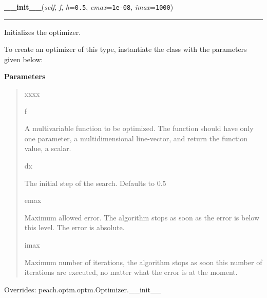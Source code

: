     \begin{boxedminipage}{\textwidth}

    \raggedright \textbf{\_\_init\_\_}(\textit{self}, \textit{f}, \textit{h}=\texttt{0.5}, \textit{emax}=\texttt{1e-08}, \textit{imax}=\texttt{1000})

    \vspace{-1.5ex}

    \rule{\textwidth}{0.5\fboxrule}

Initializes the optimizer.

To create an optimizer of this type, instantiate the class with the
parameters given below:
    \vspace{1ex}

      \textbf{Parameters}
      \begin{quote}
        \begin{Ventry}{xxxx}

          \item[f]


A multivariable function to be optimized. The function should have
only one parameter, a multidimensional line-vector, and return the
function value, a scalar.
          \item[dx]


The initial step of the search. Defaults to 0.5
          \item[emax]


Maximum allowed error. The algorithm stops as soon as the error is
below this level. The error is absolute.
          \item[imax]


Maximum number of iterations, the algorithm stops as soon this
number of iterations are executed, no matter what the error is at
the moment.
        \end{Ventry}

      \end{quote}

    \vspace{1ex}

      Overrides: peach.optm.optm.Optimizer.\_\_init\_\_

    \end{boxedminipage}

    \vspace{0.5ex}

